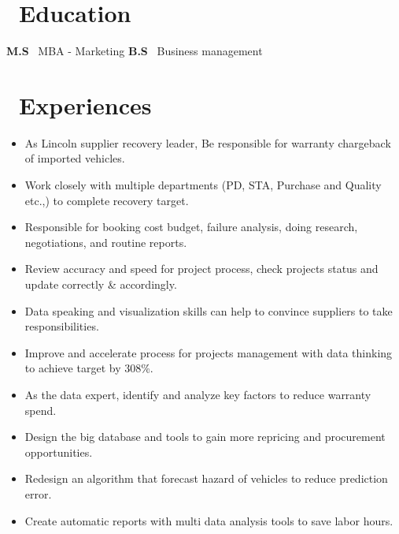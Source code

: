 \documentclass{resume}
\begin{document}

\renewcommand{\familydefault}{\sfdefault}



\basicInfo{
  \email{####} \textperiodcentered\ 
  \phone{####} \textperiodcentered\ 
  \faHome{####}\textperiodcentered\ 
}
 
\section{\faGraduationCap\  Education}
\textbf{M.S  }\ \quad MBA - Marketing
\textbf{B.S  }\ \quad Business management 

\linespread{1}
\section{\faCalendarCheckO\ Experiences}
\begin{itemize}
    \item As Lincoln supplier recovery leader, Be responsible for warranty chargeback of imported vehicles.
    \item Work closely with multiple departments (PD, STA, Purchase and Quality etc.,) to complete recovery target.
    \item Responsible for booking cost budget, failure analysis, doing research, negotiations, and routine reports.
    \item Review accuracy and speed for project process, check projects status and update correctly \& accordingly.
    \item Data speaking and visualization skills can help to convince suppliers to take responsibilities.
    \item Improve and accelerate process for projects management with data thinking to achieve target by 308\%.
\end{itemize}


\begin{itemize}
    \item As the data expert, identify and analyze key factors to reduce warranty spend.
    \item Design the big database and tools to gain more repricing and procurement opportunities.
    \item Redesign an algorithm that forecast hazard of vehicles to reduce prediction error.
    \item Create automatic reports with multi data analysis tools to save labor hours.
\end{itemize}
\end{document}
